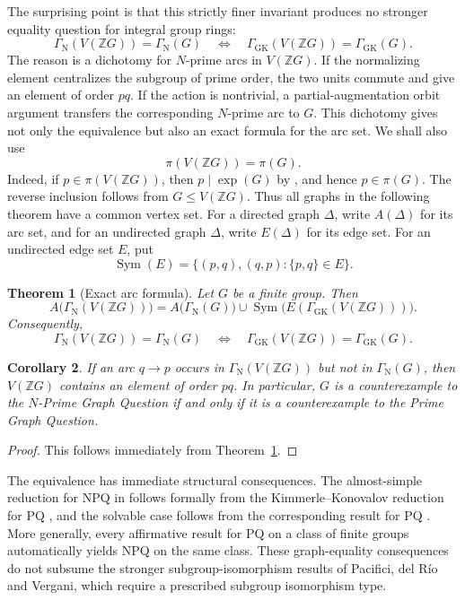 \documentclass[11pt,a4paper]{article}
\newtheorem{theorem}{Theorem}[section]
\newtheorem{corollary}[theorem]{Corollary}
\theoremstyle{remark}
\newcommand{\VZG}{V(\mathbb ZG)}
\newcommand{\GN}{\Gamma_{\mathrm N}}
\newcommand{\GGK}{\Gamma_{\mathrm{GK}}}
\newcommand{\Sym}{\operatorname{Sym}}
\begin{document}
The surprising point is that this strictly finer invariant produces no
stronger equality question for integral group rings:
\[
 \GN(\VZG)=\GN(G)
 \quad\Longleftrightarrow\quad
 \GGK(\VZG)=\GGK(G).
\]
The reason is a dichotomy for $N$-prime arcs in $\VZG$. If the normalizing
element centralizes the subgroup of prime order, the two units commute and
give an element of order $pq$. If the action is nontrivial, a
partial-augmentation orbit argument transfers the corresponding $N$-prime
arc to $G$. This dichotomy gives not only the equivalence but also an exact
formula for the arc set. We shall also use
\[
 \pi(\VZG)=\pi(G).
\]
Indeed, if $p\in\pi(\VZG)$, then $p\mid\exp(G)$ by
\cite[Corollary~4.1]{CohnLivingstone}, and hence $p\in\pi(G)$. The reverse
inclusion follows from $G\leq\VZG$. Thus all graphs in the following
theorem have a common vertex set. For a directed graph $\Delta$, write
$A(\Delta)$ for its arc set, and for an undirected graph $\Delta$, write
$E(\Delta)$ for its edge set. For an undirected edge set $E$, put
\[
 \Sym(E)=\{(p,q),(q,p):\{p,q\}\in E\}.
\]

\begin{theorem}[Exact arc formula]\label{thm:main}
Let $G$ be a finite group. Then
\begin{equation}\label{eq:identity}
 A\bigl(\GN(\VZG)\bigr)
 =
 A\bigl(\GN(G)\bigr)
 \cup
 \Sym\!\bigl(E(\GGK(\VZG))\bigr).
\end{equation}
Consequently,
\begin{equation}\label{eq:equivalence}
 \GN(\VZG)=\GN(G)
 \quad\Longleftrightarrow\quad
 \GGK(\VZG)=\GGK(G).
\end{equation}
\end{theorem}

\begin{corollary}\label{cor:counterexample}
If an arc $q\to p$ occurs in $\GN(\VZG)$ but not in $\GN(G)$, then
$\VZG$ contains an element of order $pq$. In particular, $G$ is a
counterexample to the $N$-Prime Graph Question if and only if it is a
counterexample to the Prime Graph Question.
\end{corollary}

\begin{proof}
This follows immediately from Theorem~\ref{thm:main}.
\end{proof}

The equivalence has immediate structural consequences. The almost-simple
reduction for NPQ in \cite[Theorem~A]{PRV} follows formally from the
Kimmerle--Konovalov reduction for PQ \cite{KimmerleKonovalov}, and the
solvable case \cite[Corollary~B]{PRV} follows from the corresponding result
for PQ \cite{Kimmerle2006}. More generally, every affirmative result for PQ
on a class of finite groups automatically yields NPQ on the same class.
These graph-equality consequences do not subsume the stronger
subgroup-isomorphism results of Pacifici, del R\'io and Vergani, which
require a prescribed subgroup isomorphism type.
\end{document}
